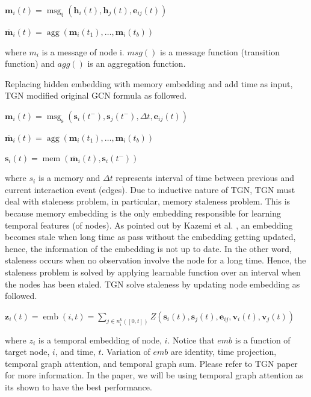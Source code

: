 \documentclass{IEEEtran}
\begin{document}
\(\mathbf{m}_{i}(t)=\operatorname{msg}_{\mathrm{t}}\left(\mathbf{h}_{i}\left(t\right), \mathbf{h}_{j}\left(t\right), \mathbf{e}_{i j}(t)\right)\)

\(\overline{\mathbf{m}}_{i}(t)=\operatorname{agg}\left(\mathbf{m}_{i}\left(t_{1}\right), \ldots, \mathbf{m}_{i}\left(t_{b}\right)\right)\)

where \(m_{i}\) is a message of node i. \(msg()\) is a message function (transition function) and \(agg()\) is an aggregation function.

Replacing hidden embedding with memory embedding and add time as input, TGN modified original GCN formula as followed.

\(\mathbf{m}_{i}(t)=\operatorname{msg}_{\mathrm{s}}\left(\mathbf{s}_{i}\left(t^{-}\right), \mathbf{s}_{j}\left(t^{-}\right), \Delta t, \mathbf{e}_{i j}(t)\right)\)

\(\overline{\mathbf{m}}_{i}(t)=\operatorname{agg}\left(\mathbf{m}_{i}\left(t_{1}\right), \ldots, \mathbf{m}_{i}\left(t_{b}\right)\right)\)

\(\mathbf{s}_{i}(t)=\operatorname{mem}\left(\overline{\mathbf{m}}_{i}(t), \mathbf{s}_{i}\left(t^{-}\right)\right)\)

where \(s_{i}\) is a memory and \(\Delta{t}\) represents interval of time between previous and current interaction event (edges).
Due to inductive nature of TGN, TGN must deal with staleness problem, in particular, memory staleness problem. This is because memory embedding is the only embedding responsible for learning temporal features (of nodes). As pointed out by Kazemi et al. \cite{kazemiRepresentationLearningDynamica}, an embedding becomes stale when long time as pass without the embedding getting updated, hence, the information of the embedding is not up to date. In the other word, staleness occurs when no observation involve the node for a long time. Hence, the staleness problem is solved by applying learnable function over an interval when the nodes has been staled. TGN solve staleness by updating node embedding as followed.

\(\mathbf{z}_{i}(t)=\operatorname{emb}(i, t)=\sum_{j \in n_{i}^{k}([0, t])} Z\left(\mathbf{s}_{i}(t), \mathbf{s}_{j}(t), \mathbf{e}_{i j}, \mathbf{v}_{i}(t), \mathbf{v}_{j}(t)\right)\)

where \(z_{i}\) is a temporal embedding of node, \(i\). Notice that \(emb\) is a function of target node, \(i\), and time, \(t\). Variation of \(emb\) are identity, time projection, temporal graph attention, and temporal graph sum. Please refer to TGN paper \cite{rossi2020temporal} for more information. In the paper, we will be using temporal graph attention as its shown to have the best performance.
\end{document}
